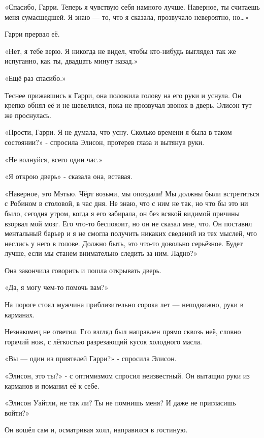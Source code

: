 \documentclass[a4paper,12pt]{book}
\begin{document}
\par
«Спасибо, Гарри. Теперь я чувствую себя намного лучше. Наверное, ты считаешь меня сумасшедшей. Я знаю — то, что я сказала, прозвучало невероятно, но…»
\par
Гарри прервал её.
\par
«Нет, я тебе верю. Я никогда не видел, чтобы кто-нибудь выглядел так же испуганно, как ты, двадцать минут назад.»
\par
«Ещё раз спасибо.»
\par
Теснее прижавшись к Гарри, она положила голову на его руки и уснула. Он крепко обнял её и не шевелился, пока не прозвучал звонок в дверь. Элисон тут же проснулась.
\par
«Прости, Гарри. Я не думала, что усну. Сколько времени я была в таком состоянии?» - спросила Элисон, протерев глаза и вытянув руки.
\par
«Не волнуйся, всего один час.»
\par
«Я открою дверь» - сказала она, вставая.
\par
«Наверное, это Мэтью. Чёрт возьми, мы опоздали! Мы должны были встретиться с Робином в столовой, в час дня. Не знаю, что с ним не так, но что бы это ни было, сегодня утром, когда я его забирала, он без всякой видимой причины взорвал мой мозг. Его что-то беспокоит, но он не сказал мне, что. Он поставил ментальный барьер и я не смогла получить никаких сведений из тех мыслей, что неслись у него в голове. Должно быть, это что-то довольно серьёзное. Будет лучше, если мы станем внимательно следить за ним. Ладно?»
\par
Она закончила говорить и пошла открывать дверь.\\
\par
«Да, я могу чем-то помочь вам?»
\par
На пороге стоял мужчина приблизительно сорока лет — неподвижно, руки в карманах.
\par
Незнакомец не ответил. Его взгляд был направлен прямо сквозь неё, словно горячий нож, с лёгкостью разрезающий кусок холодного масла.
\par
«Вы — один из приятелей Гарри?» - спросила Элисон.
\par
«Элисон, это ты?» - с оптимизмом спросил неизвестный. Он вытащил руки из карманов и поманил её к себе.
\par
«Элисон Уайтли, не так ли? Ты не помнишь меня? И даже не пригласишь войти?»
\par
Он вошёл сам и, осматривая холл, направился в гостиную.
\par
\end{document}
